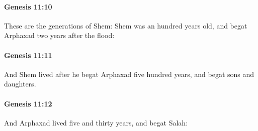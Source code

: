 		\paragraph{Genesis 11:10} %
			\label{GENESIS-11-10}

			These are the generations of Shem: Shem was an hundred years old, and begat Arphaxad two years after the flood:


		\paragraph{Genesis 11:11} %
			\label{GENESIS-11-11}

			And Shem lived after he begat Arphaxad five hundred years, and begat sons and daughters.


		\paragraph{Genesis 11:12} %
			\label{GENESIS-11-12}

			And Arphaxad lived five and thirty years, and begat Salah:



